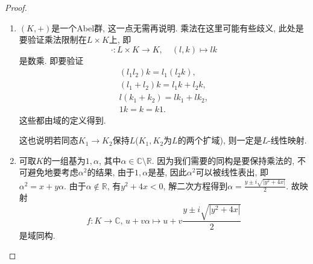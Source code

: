 \begin{proof}
    \begin{enumerate}[(1)]
        \item $(K, +)$是一个Abel群, 这一点无需再说明. 乘法在这里可能有些歧义, 此处是要验证乘法限制在$L \times K$上, 即
        \[
            \cdot: L \times K \to K, \quad (l, k) \mapsto lk
        \]
        是数乘. 即要验证
        \[
        \begin{gathered}
            (l_1l_2)k = l_1(l_2k),\\
            (l_1 + l_2)k = l_1k + l_2k,\\
            l(k_1 + k_2) = lk_1 + lk_2,\\
            1k = k = k1.
        \end{gathered}
        \]
        这些都由域的定义得到.
    
        这也说明若同态$K_1 \to K_2$保持$L$($K_1, K_2$为$L$的两个扩域), 则一定是$L$-线性映射.
        \item 可取$K$的一组基为$1, \alpha$, 其中$\alpha \in \mathbb{C} \setminus \mathbb{R}$. 因为我们需要的同构是要保持乘法的, 不可避免地要考虑$\alpha^2$的结果, 由于$1, \alpha$是基, 因此$\alpha^2$可以被线性表出, 即$\alpha^2 = x + y\alpha$. 由于$\alpha \notin \mathbb{R}$, 有$y^2 + 4x < 0$, 解二次方程得到$\alpha = \frac{y \pm i\sqrt{|y^2 + 4x|}}{2}$. 故映射
        \[
            f: K \to \mathbb{C},\, u + v\alpha \mapsto u + v\frac{y \pm i\sqrt{|y^2 + 4x|}}{2}
        \]
        是域同构.
    \end{enumerate}
\end{proof}

